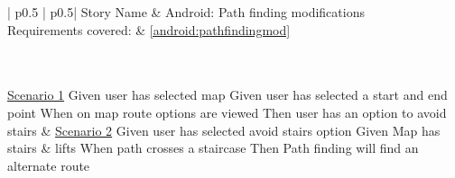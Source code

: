 \begin{longtable}{| p{} | p{}|}
	\hline
	\newline Story Name & \newline Android: Path finding modifications\\\hline
	\newline Requirements covered: & \newline \ref{android:pathfindingmod}\\\hline
	\\\hline
	\\\hline

	\newline\underline{Scenario 1}\newline
	Given user has selected map \newline
	Given user has selected a start and end point \newline
	When on map route options are viewed \newline 
	Then user has an option to avoid stairs\newline
	&
	\newline\underline{Scenario 2}\newline
	Given user has selected avoid stairs option \newline
	Given Map has stairs \& lifts \newline
	When path crosses a staircase \newline 
	Then Path finding will find an alternate route\newline
	\\\hline
\end{longtable}